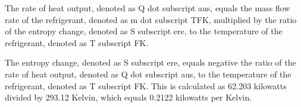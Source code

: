 The rate of heat output, denoted as Q dot subscript aus, equals the mass flow rate of the refrigerant, denoted as m dot subscript TFK, multiplied by the ratio of the entropy change, denoted as S subscript ere, to the temperature of the refrigerant, denoted as T subscript FK.

The entropy change, denoted as S subscript ere, equals negative the ratio of the rate of heat output, denoted as Q dot subscript aus, to the temperature of the refrigerant, denoted as T subscript FK. This is calculated as 62.203 kilowatts divided by 293.12 Kelvin, which equals 0.2122 kilowatts per Kelvin.